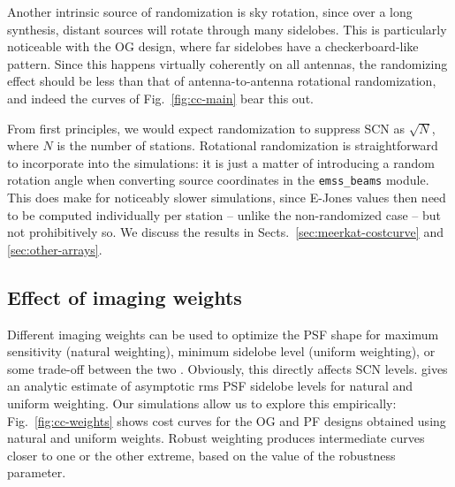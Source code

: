 \documentclass{aa}
\begin{document}
Another intrinsic source of randomization is sky rotation, since over a long synthesis, distant sources will rotate through many sidelobes. This is particularly noticeable with the OG design, where far sidelobes have a checkerboard-like pattern. Since this happens virtually coherently on all antennas, the randomizing effect should be less than that of antenna-to-antenna rotational randomization, and indeed the curves of Fig.~\ref{fig:cc-main} bear this out.

From first principles, we would expect randomization to suppress SCN as $\sqrt{N}$, where $N$ is the number of stations. Rotational randomization is straightforward to incorporate into the simulations: it is just a matter of introducing a random rotation angle when converting source coordinates in the {\tt emss\_beams} module. This does make for noticeably slower simulations, since E-Jones values then need to be computed individually per station -- unlike the non-randomized case -- but not prohibitively so. We discuss the results in Sects.~\ref{sec:meerkat-costcurve} and \ref{sec:other-arrays}.

\subsection{Effect of imaging weights}
\label{sec:img-weights}

Different imaging weights can be used to optimize the PSF shape for maximum sensitivity (natural weighting), minimum sidelobe level (uniform weighting), or some trade-off between the two \citep[robust or Briggs weighting:][]{briggs-thesis}. Obviously, this directly affects SCN levels. \citet{SKA49} gives an analytic estimate of asymptotic rms PSF sidelobe levels for natural and uniform weighting. Our simulations allow us to explore this empirically: Fig.~\ref{fig:cc-weights} shows cost curves for the OG and PF designs obtained using natural and uniform weights. Robust weighting produces intermediate curves closer to one or the other extreme, based on the value of the robustness parameter.
\end{document}
